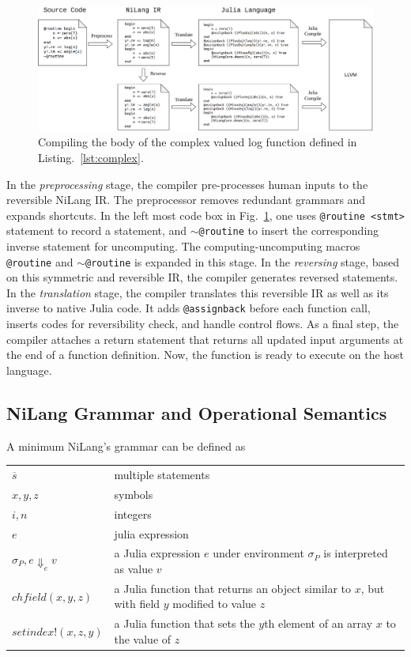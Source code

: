 \documentclass{article}
\let\oldsim\sim
\renewcommand{\sim}{{\oldsim}}
\newcommand{\<}{\langle}
\renewcommand{\>}{\rangle}
\newcommand{\Fig}[1]{Fig.~\ref{#1}}
\newcommand{\Lst}[1]{Listing.~\ref{#1}}
\theoremstyle{definition}\newtheorem{definition}{\textit{Definition}}
\begin{document}
\begin{figure}
    \centerline{\includegraphics[width=0.95\columnwidth,trim={0cm 0cm 0cm 0cm},clip]{compiling_v2.pdf}}
    \caption{Compiling the body of the complex valued log function defined in \Lst{lst:complex}.}\label{fig:compiling}
\end{figure}

In the \textit{preprocessing} stage, the compiler pre-processes human inputs to the reversible NiLang IR.
The preprocessor removes redundant grammars and expands shortcuts. In the left most code box in \Fig{fig:compiling}, one uses \texttt{@routine <stmt>} statement to record a statement, and \texttt{$\sim$@routine} to insert the corresponding inverse statement for uncomputing.
The computing-uncomputing macros \texttt{@routine} and \texttt{$\sim$@routine} is expanded in this stage.
In the \textit{reversing} stage, based on this symmetric and reversible IR, the compiler generates reversed statements.
In the \textit{translation} stage, the compiler translates this reversible IR as well as its inverse to native Julia code. It adds \texttt{@assignback} before each function call, inserts codes for reversibility check, and handle control flows.
As a final step, the compiler attaches a return statement that returns all updated input arguments at the end of a function definition.
Now, the function is ready to execute on the host language.


\subsection{NiLang Grammar and Operational Semantics}\label{app:grammar}

A minimum NiLang's grammar can be defined as

\begin{tabular}[t]{ll}
    $\overline s$ & multiple statements\\
    $x, y, z$ & symbols\\
    $i, n$ & integers \\
    $e$  & julia expression \\
    $\sigma_P, e \Downarrow_e v$ & a Julia expression $e$ under environment $\sigma_P$ is interpreted as value $v$ \\
    $\mathit{chfield(x, y, z)}$ & a Julia function that returns an object similar to $x$, but with field $y$ modified to value $z$\\
    $\mathit{setindex!(x, z, y)}$ & a Julia function that sets the $y$th element of an array $x$ to the value of $z$ \\
\end{tabular}
\end{document}
